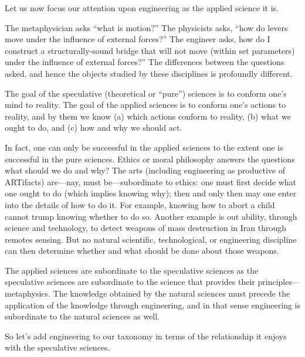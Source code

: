 Let us now focus our attention upon engineering as the applied science it is.

The metaphysician asks ``what is motion?'' The physicists asks, ``how do levers move under the influence of external forces?'' The engineer asks, how do I construct a structurally-sound bridge that will not move (within set parameters) under the influence of external forces?'' The differences between the questions asked, and hence the objects studied by these disciplines is profoundly different.

The goal of the speculative (theoretical or ``pure'') sciences is to conform one's mind to reality. The goal of the applied sciences is to conform one's actions to reality, and by them we know (a) which actions conform to reality, (b) what we ought to do, and (c) how and why we should act.

In fact, one can only be successful in the applied sciences to the extent one is successful in the pure sciences. Ethics or moral philosophy answers the questions what should we do and why? The arts (including engineering as productive of ARTifacts) are---nay, must be---subordinate to ethics: one must first decide what one ought to do (which implies knowing why); then and only then may one enter into the details of how to do it. For example, knowing how to abort a child cannot trump knowing whether to do so. Another example is out ability, through science and technology, to detect weapons of mass destruction in Iran through remotes sensing. But no natural scientific, technological, or engineering discipline can then determine whether and what should be done about those weapons.

The applied sciences are subordinate to the speculative sciences as the speculative sciences are subordinate to the science that provides their principles---metaphysics. The knowledge obtained by the natural sciences must precede the application of the knowledge through engineering, and in that sense engineering is subordinate to the natural sciences as well.

So let's add engineering to our taxonomy in terms of the relationship it enjoys with the speculative sciences.

